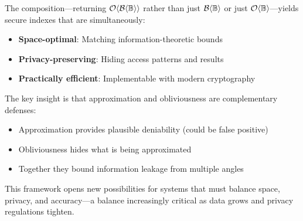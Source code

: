 \documentclass[11pt,final]{article}
\newcommand{\BernBool}{\mathcal{B}\langle \Bool \rangle}
\begin{document}
The composition—returning $\Obv{\BernBool}$ rather than just $\BernBool$ or just $\mathcal{O}\langle \mathbb{B} \rangle$—yields secure indexes that are simultaneously:
\begin{itemize}
    \item \textbf{Space-optimal}: Matching information-theoretic bounds
    \item \textbf{Privacy-preserving}: Hiding access patterns and results
    \item \textbf{Practically efficient}: Implementable with modern cryptography
\end{itemize}

The key insight is that approximation and obliviousness are complementary defenses:
\begin{itemize}
    \item Approximation provides plausible deniability (could be false positive)
    \item Obliviousness hides what is being approximated
    \item Together they bound information leakage from multiple angles
\end{itemize}

This framework opens new possibilities for systems that must balance space, privacy, and accuracy—a balance increasingly critical as data grows and privacy regulations tighten.


\end{document}
